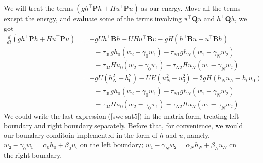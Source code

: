 \documentclass{article}
\theoremstyle{definition}
\begin{document}
    We will treat the terms $\left(gh^\top \mathbf{P}h + H u^\top \mathbf{P}u \right)$ 
    as our energy. Move all the terms except the energy, and evaluate some of the 
    terms involving $u^\top \mathbf{Q}u$ and $h^\top \mathbf{Q}h$, we got 
    \begin{align}
        \frac{d}{dt}\left(gh^\top \mathbf{P}h + H u^\top \mathbf{P}u \right) &=
        - gUh^\top \mathbf{B} h - UHu^\top \mathbf{B} u 
        - gH \left(h^\top \mathbf{B}u + u^\top \mathbf{B}h \right)\nonumber \\
        & \qquad  - \tau_{01} gh_0 \left(w_2 - \gamma_0 w_1 \right)
        - \tau_{N1} gh_N \left(w_1 - \gamma_N w_2 \right) \nonumber \\
        & \qquad  - \tau_{02} Hu_0 \left(w_2 - \gamma_0 w_1 \right)
        - \tau_{N2} Hu_N \left(w_1 - \gamma_N w_2 \right)\\
        & = -gU (h_N^2 - h_0^2) - UH(u_N^2 - u_0^2) - 2gH(h_Nu_N - h_0u_0) \nonumber \\
        & \qquad  - \tau_{01} gh_0 \left(w_2 - \gamma_0 w_1 \right)
        - \tau_{N1} gh_N \left(w_1 - \gamma_N w_2 \right) \nonumber \\
        & \qquad  - \tau_{02} Hu_0 \left(w_2 - \gamma_0 w_1 \right)
        - \tau_{N2} Hu_N \left(w_1 - \gamma_N w_2 \right) \label{swe-sat5} 
    \end{align}
    We could write the last expression (\ref{swe-sat5}) in the matrix form, 
    treating left boundary and right boundary separately. Before that, 
    for convenience, we would our boundary conditoin implemented in 
    the form of $h$ and $u$, namely, $w_2 - \gamma_0 w_1 = \alpha_0 h_0 + \beta_0 u_0$ on the left boundary; 
    $w_1 - \gamma_N w_2 = \alpha_N h_N + \beta_N u_N$ on the right boundary. 
    
\end{document}
